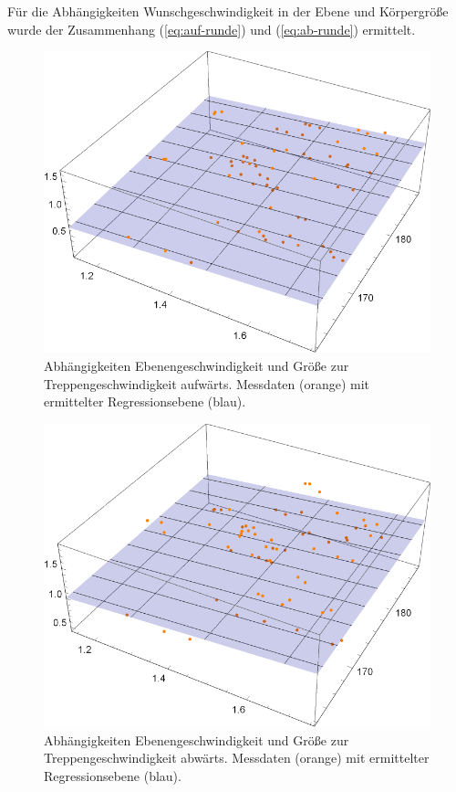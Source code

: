 Für die Abhängigkeiten Wunschgeschwindigkeit in der Ebene und Körpergröße wurde 
der Zusammenhang (\ref{eq:auf-runde}) und (\ref{eq:ab-runde}) ermittelt.

\begin{figure} \centering 
	\includegraphics[]{abbildungen/regression/2017/auf-ebene-groesse.pdf}
	
	\caption{Abhängigkeiten Ebenengeschwindigkeit und Größe zur Treppengeschwindigkeit aufwärts. Messdaten (orange) mit ermittelter Regressionsebene (blau). \label{fig:auf-ebene-groesse}}
\end{figure}

\begin{figure} \centering 
	\includegraphics[]{abbildungen/regression/2017/ab-ebene-groesse.pdf}
	
	\caption{Abhängigkeiten Ebenengeschwindigkeit und Größe zur Treppengeschwindigkeit abwärts. Messdaten (orange) mit ermittelter Regressionsebene (blau). \label{fig:ab-ebene-groesse}}
\end{figure}


